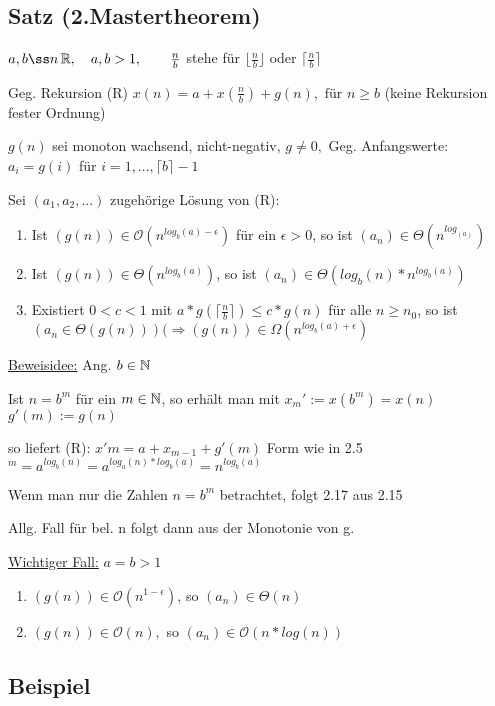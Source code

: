 \subsection{Satz (2.Mastertheorem)}%

$a,b ßn \R,\quad a,b >1, \qquad \frac{n}{b}$ stehe für $\lfloor\frac{n}{b}\rfloor$ oder $\lceil \frac{n}{b}\rceil$

Geg. Rekursion (R) $x(n) = a+x(\frac{n}{b}) + g(n), \text{ für } n \geq b$ (keine Rekursion fester Ordnung)

$g(n)$ sei monoton wachsend, nicht-negativ, $g\neq 0,$ Geg. Anfangswerte: $a_i = g(i)$ für $i=1,...,\lceil b \rceil -1$

Sei $(a_1,a_2,...)$ zugehörige Lösung von (R):
\begin{enumerate}
	\item Ist $(g(n)) \in \mathcal{O}(n^{log_b(a)-\epsilon})$ für ein $\epsilon >0$, so ist $(a_n) \in \Theta (n^{log_(a)})$
	\item Ist $(g(n)) \in \Theta(n^{log_b(a)})$, so ist $(a_n) \in \Theta(log_b(n)*n^{log_b(a)})$
	\item Existiert $0<c<1$ mit $a*g(\lceil\frac{n}{b}\rceil) \leq c*g(n)$  für alle $n\geq n_0$, so ist $(a_n \in \Theta(g(n)))$\quad$(\Rightarrow (g(n)) \in \Omega(n^{log_b(a)+\epsilon})$
\end{enumerate}

\underline{Beweisidee:} Ang. $b \in \operatorname{\mathbb{N}}$ 

Ist $n =b^m$ für ein $m \in \operatorname{\mathbb{N}}$, so erhält man mit $x_m' := x(b^m)=x(n)$ \qquad $g'(m):= g(n)$

so liefert (R): $x'm = a+x_{m-1} +g'(m)$ \qquad Form wie in 2.5
$^m = a^{log_b(n)} = a^{log_a(n)*log_b(a)} = n^{log_b(a)}$

Wenn man nur die Zahlen $n=b^m$ betrachtet, folgt 2.17 aus 2.15

Allg. Fall für bel. n folgt dann aus der Monotonie von g.

\underline{Wichtiger Fall:} $a=b>1$

\begin{enumerate}
	\item $(g(n)) \in \mathcal{O}(n^{1-\epsilon})$, so $(a_n) \in \Theta (n)$
	\item $(g(n)) \in \mathcal{O}(n),$ so $ (a_n) \in \mathcal{O}(n*log(n))$ 
\end{enumerate}

\subsection{Beispiel}%

